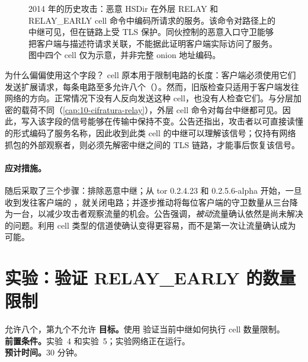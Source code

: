 \begin{figure}[htbp]
\centering

\caption{2014 年的历史攻击：恶意 HSDir 在外层 RELAY 和 RELAY\_EARLY cell 命令中编码所请求的服务。该命令对路径上的中继可见，但在链路上受 TLS 保护。同伙控制的恶意入口守卫能够把客户端与描述符请求关联，不能据此证明客户端实际访问了服务。图中四个 cell 仅为示意，并非完整 onion 地址编码。}
\label{fig:relayearly}
\end{figure}

为什么偏偏使用这个字段？ cell 原本用于限制电路的长度：客户端必须使用它们发送扩展请求，每条电路至多允许八个（）。然而，旧版检查只适用于客户端发往网络的方向。正常情况下没有人反向发送这种 cell，也没有人检查它们。与分层加密的载荷不同（\cref{cap:10-cifratura-relay}），外层 cell 命令对每台中继都可见。因此，写入该字段的信号能够在传输中保持不变。公告还指出，攻击者以可直接读懂的形式编码了服务名称，因此收到此类 cell 的中继可以理解该信号；仅持有网络抓包的外部观察者，则必须先解密中继之间的 TLS 链路，才能事后恢复该信号。

\paragraph{应对措施。}随后采取了三个步骤：排除恶意中继；从 tor 0.2.4.23 和 0.2.5.6-alpha 开始，一旦收到发往客户端的 ，就关闭电路；并逐步推动将每位客户端的守卫数量从三台降为一台，以减少攻击者观察流量的机会。公告强调，\emph{被动}流量确认依然是尚未解决的问题。利用 cell 类型的信道使确认变得更容易，而不是第一次让流量确认成为可能。

\section{实验：验证 RELAY\_EARLY 的数量限制}\label{sec:lab-casi}

\begin{laboratorio}[17]{允许八个，第九个不允许}
\textbf{目标。}使用  验证当前中继如何执行  cell 数量限制。\\
\textbf{前置条件。}实验~4 和实验~5；实验网络正在运行。\\
\textbf{预计时间。}30 分钟。
\end{laboratorio}

